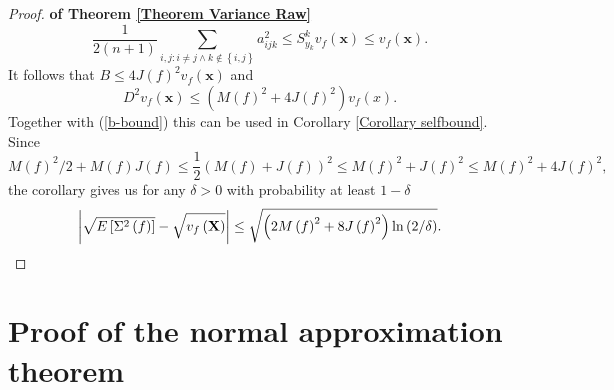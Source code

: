 \documentclass[final,12pt]{colt2018} %
\begin{document}
\begin{proof}{\bf of Theorem \protect\ref{Theorem Variance Raw}}
\begin{equation*}
							\frac{1}{2\left( n+1\right) }\sum_{i,j:i\neq j\wedge k\notin \left\{
								i,j\right\} }a_{ijk}^{2}\leq S_{y_{k}}^{k}v_{f}\left( \mathbf{x}\right) \leq
							v_{f}\left( \mathbf{x}\right) . 
							\end{equation*}%
							It follows that $B\leq 4J\left( f\right) ^{2}v_{f}\left( \mathbf{x}\right) $
							and 
							\begin{equation*}
							D^{2}v_{f}\left( \mathbf{x}\right) \leq \left( M\left( f\right)
							^{2}+4J\left( f\right) ^{2}\right) v_{f}\left( x\right) . 
							\end{equation*}%
							Together with (\ref{b-bound}) this can be used in Corollary \ref{Corollary
								selfbound}. Since 
							\begin{equation*}
							M\left( f\right) ^{2}/2+M\left( f\right) J\left( f\right) \leq \frac{1}{2}%
							\left( M\left( f\right) +J\left( f\right) \right) ^{2}\leq M\left( f\right)
							^{2}+J\left( f\right) ^{2}\leq M\left( f\right) ^{2}+4J\left( f\right) ^{2}, 
							\end{equation*}%
							the corollary gives us for any $\delta >0$ with probability at least $%
							1-\delta $%
							\begin{equation*}
							\left\vert \sqrt{E\left[ \Sigma ^{2}\left( f\right) \right] }-\sqrt{%
								v_{f}\left( \mathbf{X}\right) }\right\vert \leq \sqrt{\left( 2M\left(
								f\right) ^{2}+8J\left( f\right) ^{2}\right) \ln \left( 2/\delta \right) }. 
							\end{equation*}%
							
						\end{proof}
						
						\section{Proof of the normal approximation theorem\label{Subsection Proof normal approximation}%
						}
						
\end{document}
